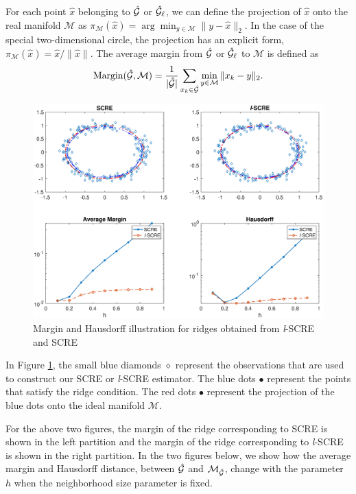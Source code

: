 \documentclass[aos,preprint]{imsart}
\theoremstyle{remark}
\begin{document}
For each point $\hat{x}$ belonging to ${\cal \hat{G}}$ or ${\cal \hat{G}}_\ell$, we can define the projection of $\hat{x}$ onto the real manifold $\mathcal M$ as $\pi_{\mathcal M}(\hat{x}) = \arg\min_{y\in \mathcal M} \|y-\hat{x}\|_2$. In the case of the special two-dimensional circle, the projection has an explicit form, $\pi_{\mathcal M}(\hat{x}) = \hat{x}/\|\hat{x}\|$. The average margin from $\cal \hat{G}$ or ${ \cal \hat{G}}_\ell$ to $\mathcal M$ is defined as
\[
{\rm Margin}({ \cal \hat{G}, \mathcal M}) =\frac{1}{|{\cal \hat{G}}|}  \sum_{x_k\in  {\cal \hat{G}}} \min_{y\in \mathcal M}\|x_k-y\|_2.
\]
\begin{figure}[t] %
   \includegraphics[width=\linewidth]{circle8.eps} 
   \vspace{-1cm}
   \caption{Margin and Hausdorff illustration for ridges obtained from {\it l}-SCRE and SCRE}
   \label{fig:circle6}
\end{figure}

In Figure \ref{fig:circle6}, the small blue diamonds $\diamond$ represent the observations that are used to construct our SCRE or {\it l}-SCRE estimator. The blue dots $\bullet$ represent the points that satisfy the ridge condition. The red dots $\bullet$ represent the projection of the blue dots onto the ideal manifold ${\mathcal M}$.

For the above two figures, the margin of the ridge corresponding to SCRE is shown in the left partition and the margin of the ridge corresponding to {\it l}-SCRE is shown in the right partition.
In the two figures below, we show how the average margin and Hausdorff distance, between $\cal \hat{G}$ and ${\cal M}_{\cal \hat{G}}$, change with the parameter $h$ when the neighborhood size parameter is fixed.
\end{document}
